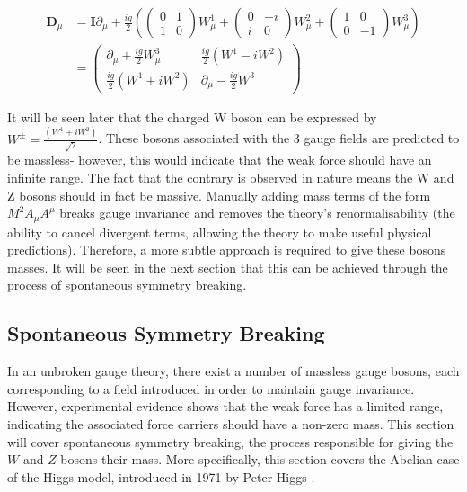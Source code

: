 \documentclass{article}
\begin{document}
\begin{equation}
\begin{split}
\bm{D}_\mu & = \bm{I}\partial_\mu + \frac{ig}{2}\left( \left(
\begin{matrix}
0 & 1 \\
1 & 0
\end{matrix}\right) W^{1}_\mu + \left(
\begin{matrix}
0 & -i \\
i & 0
\end{matrix}\right)W^{2}_\mu + \left(
\begin{matrix}
1 & 0 \\
0 & -1
\end{matrix}\right)W^{3}_\mu
\right) \\
& = \left(
\begin{matrix}
\partial_\mu + \frac{ig}{2}W^{3}_\mu & \frac{ig}{2}(W^1 -iW^2 ) \\
\frac{ig}{2}(W^1 + iW^2) & \partial_\mu - \frac{ig}{2}W^3
\end{matrix} \right)
\end{split}
\end{equation}

It will be seen later that the charged W boson can be expressed by $W^{\pm} = \frac{(W^1 \mp iW^2)}{\sqrt{2}}$. These bosons associated with the 3 gauge fields are predicted to be massless- however, this would indicate that the weak force should have an infinite range. The fact that the contrary is observed in nature means the W and Z bosons should in fact be massive. Manually adding mass terms of the form $M^2A_\mu A^\mu$ breaks gauge invariance and removes the theory's renormalisability (the ability to cancel divergent terms, allowing the theory to make useful physical predictions). Therefore, a more subtle approach is required to give these bosons masses. It will be seen in the next section that this can be achieved through the process of spontaneous symmetry breaking.
\subsection{Spontaneous Symmetry Breaking}%
\label{sec:SM_SSB}

In an unbroken gauge theory, there exist a number of massless gauge bosons, each corresponding to a field introduced in order to maintain gauge invariance. However, experimental evidence shows that the weak force has a limited range, indicating the associated force carriers should have a non-zero mass. This section will cover spontaneous symmetry breaking, the process responsible for giving the $W$ and $Z$ bosons their mass. More specifically, this section covers the Abelian case of the Higgs model, introduced in 1971 by Peter Higgs \cite{HiggsMechanism}.
\end{document}
